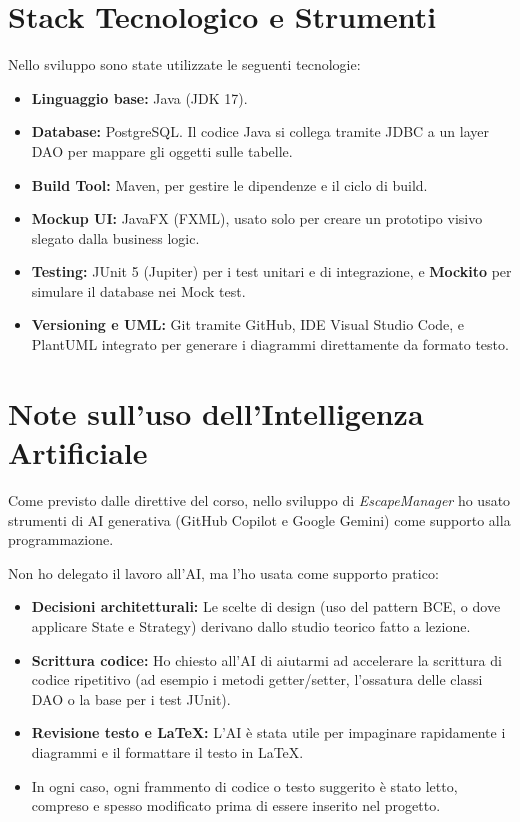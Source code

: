 \section{Stack Tecnologico e Strumenti}
Nello sviluppo sono state utilizzate le seguenti tecnologie:
\begin{itemize}
    \item \textbf{Linguaggio base:} Java (JDK 17).
    \item \textbf{Database:} PostgreSQL. Il codice Java si collega tramite JDBC a un layer DAO per mappare gli oggetti sulle tabelle.
    \item \textbf{Build Tool:} Maven, per gestire le dipendenze e il ciclo di build.
    \item \textbf{Mockup UI:} JavaFX (FXML), usato solo per creare un prototipo visivo slegato dalla business logic.
    \item \textbf{Testing:} JUnit 5 (Jupiter) per i test unitari e di integrazione, e \textbf{Mockito} per simulare il database nei Mock test.
    \item \textbf{Versioning e UML:} Git tramite GitHub, IDE Visual Studio Code, e PlantUML integrato per generare i diagrammi direttamente da formato testo.
\end{itemize}

\section{Note sull'uso dell'Intelligenza Artificiale}
Come previsto dalle direttive del corso, nello sviluppo di \textit{EscapeManager} ho usato strumenti di AI generativa (GitHub Copilot e Google Gemini) come supporto alla programmazione. 

Non ho delegato il lavoro all'AI, ma l'ho usata come supporto pratico:
\begin{itemize}
    \item \textbf{Decisioni architetturali:} Le scelte di design (uso del pattern BCE, o dove applicare State e Strategy) derivano dallo studio teorico fatto a lezione.
    \item \textbf{Scrittura codice:} Ho chiesto all'AI di aiutarmi ad accelerare la scrittura di codice ripetitivo (ad esempio i metodi getter/setter, l'ossatura delle classi DAO o la base per i test JUnit).
    \item \textbf{Revisione testo e \LaTeX:} L'AI è stata utile per impaginare rapidamente i diagrammi e il formattare il testo in \LaTeX.
    \item In ogni caso, ogni frammento di codice o testo suggerito è stato letto, compreso e spesso modificato prima di essere inserito nel progetto.
\end{itemize}

